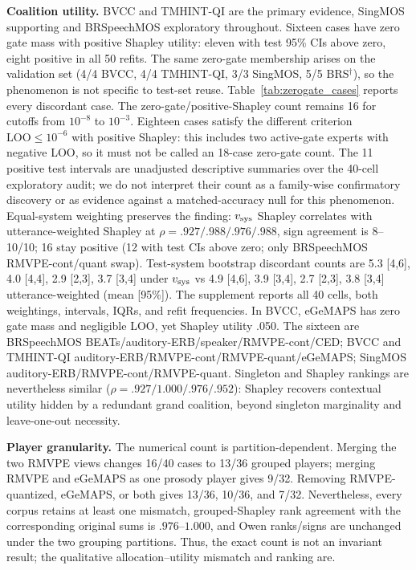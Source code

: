 \documentclass{article}
\begin{document}
\noindent\textbf{Coalition utility.} BVCC and TMHINT-QI are the primary
evidence, SingMOS supporting and BRSpeechMOS exploratory throughout.
Sixteen cases have zero gate mass with
positive Shapley utility: eleven with test 95\% CIs above zero, eight positive
in all 50 refits. The same zero-gate membership arises on the validation set
(4/4 BVCC, 4/4 TMHINT-QI, 3/3 SingMOS, 5/5 BRS$^\dagger$), so the
phenomenon is not specific to test-set reuse. Table~\ref{tab:zerogate_cases}
reports every discordant case. The zero-gate/positive-Shapley count
remains 16 for cutoffs from $10^{-8}$ to
$10^{-3}$. Eighteen cases satisfy the different criterion
$\mathrm{LOO}\leq10^{-6}$ with positive Shapley: this includes two active-gate
experts with negative LOO, so it must not be called an 18-case zero-gate count.
The 11 positive test intervals are unadjusted descriptive summaries over the
40-cell exploratory audit; we do not interpret their count as a family-wise
confirmatory discovery or as evidence against a matched-accuracy null for this
phenomenon.
Equal-system weighting preserves the finding: $v_{\rm sys}$ Shapley correlates
with utterance-weighted Shapley at $\rho=.927/.988/.976/.988$, sign agreement
is 8--10/10; 16 stay positive (12 with test CIs above zero; only BRSpeechMOS
RMVPE-cont/quant swap).
Test-system bootstrap discordant counts are 5.3 [4,6],
4.0 [4,4], 2.9 [2,3], 3.7 [3,4] under $v_{\rm sys}$ vs
4.9 [4,6], 3.9 [3,4], 2.7 [2,3], 3.8 [3,4] utterance-weighted (mean [95\%]).
The supplement reports all 40 cells, both weightings, intervals, IQRs, and refit frequencies.
In BVCC, eGeMAPS has zero gate mass and negligible LOO, yet Shapley utility
.050. The sixteen are BRSpeechMOS BEATs/auditory-ERB/speaker/RMVPE-cont/CED;
BVCC and TMHINT-QI auditory-ERB/RMVPE-cont/RMVPE-quant/eGeMAPS; SingMOS
auditory-ERB/RMVPE-cont/RMVPE-quant. Singleton and Shapley
rankings are nevertheless similar ($\rho=.927/1.000/.976/.952$): Shapley recovers
contextual utility hidden by a redundant grand coalition, beyond singleton
marginality and leave-one-out necessity.



\noindent\textbf{Player granularity.} The numerical count is partition-dependent.
Merging the two RMVPE views changes 16/40 cases to 13/36 grouped players;
merging RMVPE and eGeMAPS as one prosody player gives 9/32. Removing
RMVPE-quantized, eGeMAPS, or both gives 13/36, 10/36, and 7/32. Nevertheless,
every corpus retains at least one mismatch, grouped-Shapley rank agreement with
the corresponding original sums is $.976$--$1.000$, and Owen ranks/signs are
unchanged under the two grouping partitions. Thus, the exact count is not an
invariant result; the qualitative allocation--utility mismatch and ranking are.
\end{document}
